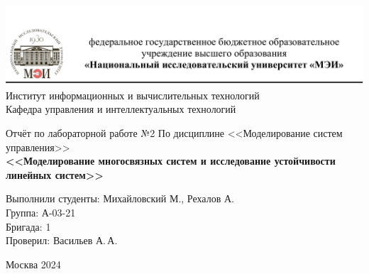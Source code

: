 \begin{titlepage}
	\newpage
	\begin{center}
		\includegraphics[width=\textwidth]{png/tit.png}
		Институт информационных и вычислительных технологий \\
			Кафедра управления и интеллектуальных технологий
		\vspace{1.25cm}
	\end{center}
	
	\vspace{1.2em}
	
	\begin{center}
		\begin{spacing}{1}
			{\Large Отчёт по лабораторной работе №2 \linebreak
			По дисциплине <<Моделирование систем управления>> \\}
			\large{\bf<<Моделирование многосвязных систем и исследование
				устойчивости линейных систем>>}
		\end{spacing}
	\end{center}
	
	\vspace{5em}
	

	\vspace{6em}
	
		\noindent Выполнили студенты: Михайловский М., Рехалов А. \\
		Группа: А-03-21 \\
		Бригада: 1\\
		Проверил: Васильев А.\,А.
	
	
	\vspace{\fill}
	
	\begin{center}
		Москва 2024
	\end{center}
	
\end{titlepage}